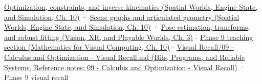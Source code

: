 \href{../05-Spatial-Worlds-Engine-State-and-Simulation/main.pdf\#nameddest=04-visual-computing-ii-ch029-optimization-constraints-and-inverse-kinematics}{Optimization, constraints, and inverse kinematics (Spatial Worlds, Engine State, and Simulation, Ch. 10)} · \href{../05-Spatial-Worlds-Engine-State-and-Simulation/main.pdf\#nameddest=04-visual-computing-ii-ch029-scene-graphs-and-articulated-geometry}{Scene graphs and articulated geometry (Spatial Worlds, Engine State, and Simulation, Ch. 10)} · \href{../07-Vision-XR-and-Playable-Worlds/main.pdf\#nameddest=04-visual-computing-ii-ch032-pose-estimation-transforms-and-robust-fitting}{Pose estimation, transforms, and robust fitting (Vision, XR, and Playable Worlds, Ch. 3)} - \href{../02-Mathematics-for-Visual-Computing/main.pdf\#nameddest=02-foundations-ii-ch026-optimization-and-inverse-problems}{Phase 9 teaching section (Mathematics for Visual Computing, Ch. 10)} - \href{../01-Bits-Programs-and-Reliable-Systems/main.pdf\#nameddest=appendix-adf48f5dc5c1}{Visual Recall/09 - Calculus and Optimization - Visual Recall.md (Bits, Programs, and Reliable Systems, Reference notes: 09 - Calculus and Optimization - Visual Recall)} · Phase 9 visual recall

